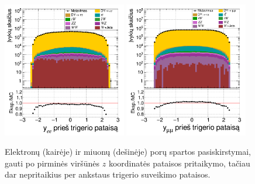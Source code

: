 \documentclass[a4paper, 12pt, twoside]{article}
\begin{document}
\begin{figure}[H]
	\includegraphics[width=0.48\textwidth]{ee_rapi_beforeL1.png}
	\includegraphics[width=0.48\textwidth]{mumu_rapi_beforeL1.png}
	\caption{\label{fig:rapibL1} Elektronų (kairėje) ir miuonų (dešinėje) porų spartos pasiskirstymai,
		gauti po pirminės viršūnės $z$ koordinatės pataisos pritaikymo, tačiau dar nepritaikius per ankstaus
		trigerio suveikimo pataisos.}
\end{figure}
\end{document}
